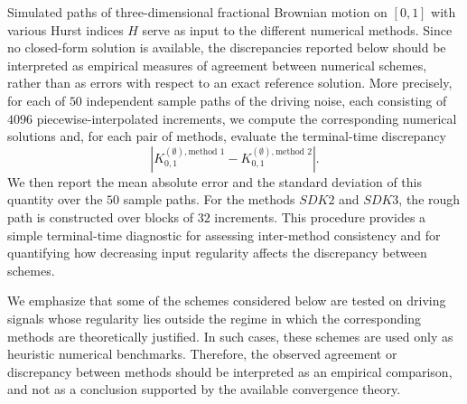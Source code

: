 \documentclass{article}%
\begin{document}
Simulated paths of three-dimensional fractional Brownian motion on \([0,1]\) with various Hurst indices \(H\) serve as input to the different numerical methods. Since no closed-form solution is available, the discrepancies reported below should be interpreted as empirical measures of agreement between numerical schemes, rather than as errors with respect to an exact reference solution. More precisely, for each of \(50\) independent sample paths of the driving noise, each consisting of \(4096\) piecewise-interpolated increments, we compute the corresponding numerical solutions and, for each pair of methods, evaluate the terminal-time discrepancy
\[
\left|K^{(\emptyset),\text{method 1}}_{0,1}-K^{(\emptyset),\text{method 2}}_{0,1}\right|.
\]
We then report the mean absolute error and the standard deviation of this quantity over the \(50\) sample paths. For the methods \(SDK2\) and \(SDK3\), the rough path is constructed over blocks of \(32\) increments. This procedure provides a simple terminal-time diagnostic for assessing inter-method consistency and for quantifying how decreasing input regularity affects the discrepancy between schemes.

We emphasize that some of the schemes considered below are tested on driving signals whose regularity lies outside the regime in which the corresponding methods are theoretically justified. In such cases, these schemes are used only as heuristic numerical benchmarks. Therefore, the observed agreement or discrepancy between methods should be interpreted as an empirical comparison, and not as a conclusion supported by the available convergence theory.
\end{document}
